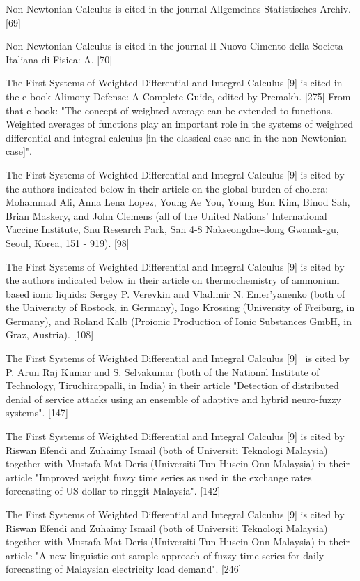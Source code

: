 \documentclass[12pt]{article}
\begin{document}
Non-Newtonian Calculus is cited in the journal Allgemeines Statistisches Archiv. [69]

Non-Newtonian Calculus is cited in the journal Il Nuovo Cimento della Societa Italiana di Fisica: A. [70]

The First Systems of Weighted Differential and Integral Calculus [9] is cited in the e-book Alimony Defense: A Complete Guide, edited by Premakh. [275] From that e-book: "The concept of weighted average can be extended to functions. Weighted averages of functions play an important role in the systems of weighted differential and integral calculus [in the classical case and in the non-Newtonian case]". 

The First Systems of Weighted Differential and Integral Calculus [9] is cited by the authors indicated below in their article on the global burden of cholera: Mohammad Ali, Anna Lena Lopez, Young Ae You, Young Eun Kim, Binod Sah, Brian Maskery, and John Clemens (all of the United Nations' International Vaccine Institute, Snu Research Park, San 4-8 Nakseongdae-dong Gwanak-gu, Seoul, Korea, 151 - 919). [98]

The First Systems of Weighted Differential and Integral Calculus [9] is cited by the authors indicated below in their article on thermochemistry of ammonium based ionic liquids: Sergey P. Verevkin and Vladimir N. Emer'yanenko (both of the University of Rostock, in Germany), Ingo Krossing (University of Freiburg, in Germany), and Roland Kalb (Proionic Production of Ionic Substances GmbH, in Graz, Austria). [108]

The First Systems of Weighted Differential and Integral Calculus [9]  is cited by P. Arun Raj Kumar and S. Selvakumar (both of the National Institute of Technology, Tiruchirappalli, in India) in their article "Detection of distributed denial of service attacks using an ensemble of adaptive and hybrid neuro-fuzzy systems". [147]      

The First Systems of Weighted Differential and Integral Calculus [9] is cited by Riswan Efendi and Zuhaimy Ismail (both of Universiti Teknologi Malaysia) together with Mustafa Mat Deris (Universiti Tun Husein Onn Malaysia) in their article "Improved weight fuzzy time series as used in the exchange rates forecasting of US dollar to ringgit Malaysia". [142]  

The First Systems of Weighted Differential and Integral Calculus [9] is cited by Riswan Efendi and Zuhaimy Ismail (both of Universiti Teknologi Malaysia) together with Mustafa Mat Deris (Universiti Tun Husein Onn Malaysia) in their article "A new linguistic out-sample approach of fuzzy time series for daily forecasting of Malaysian electricity load demand". [246]   
\end{document}
